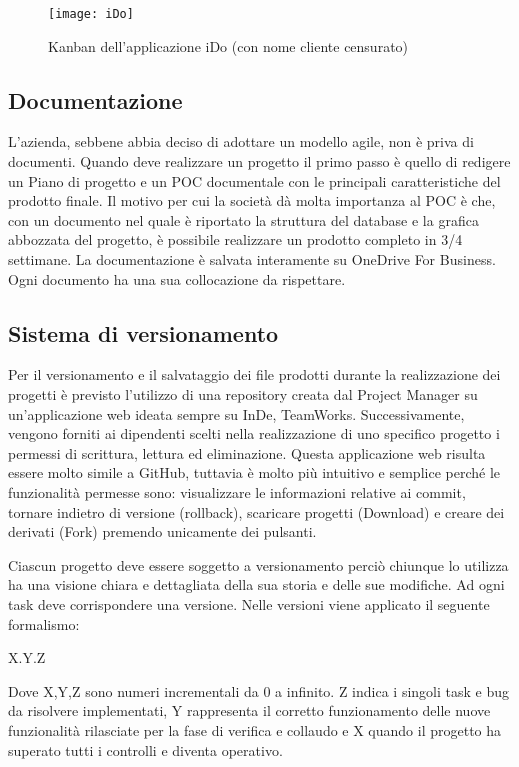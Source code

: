 \begin{figure}[!h] 
	\centering 
	\texttt{[image: iDo]} 
	\caption{Kanban dell'applicazione iDo (con nome cliente censurato)}
	\label{ido}
\end{figure}



\subsection{Documentazione}
\label{cap1:Documentazione}

L'azienda, sebbene abbia deciso di adottare un modello agile, non è priva di documenti. Quando deve realizzare un progetto il primo passo è quello di redigere un Piano di progetto e un POC documentale con le principali caratteristiche del prodotto finale. 
Il motivo per cui la società dà molta importanza al POC è che, con un documento nel quale è riportato la struttura del database e la grafica abbozzata del progetto, è possibile realizzare un prodotto completo in 3/4 settimane. 
La documentazione è salvata interamente su OneDrive For Business. Ogni documento ha una sua collocazione da rispettare. 

\subsection{Sistema di versionamento}
\label{cap1:Sistema di versionamento}

Per il versionamento e il salvataggio dei file prodotti durante la realizzazione dei progetti è previsto l'utilizzo di una repository creata dal Project Manager su un'applicazione web ideata sempre su InDe, TeamWorks. Successivamente, vengono forniti ai dipendenti scelti nella realizzazione di uno specifico progetto i permessi di scrittura, lettura ed eliminazione.
Questa applicazione web risulta essere molto simile a GitHub, tuttavia è molto più intuitivo e semplice perché le funzionalità permesse sono: visualizzare le informazioni relative ai commit, tornare indietro di versione (rollback), scaricare progetti (Download) e creare dei derivati (Fork) premendo unicamente dei pulsanti.

Ciascun progetto deve essere soggetto a versionamento perciò chiunque lo utilizza ha una visione chiara e dettagliata della sua storia e delle sue modifiche. Ad ogni task deve corrispondere una versione. Nelle versioni viene applicato il seguente formalismo:
\begin{center}
	X.Y.Z
\end{center}
Dove X,Y,Z sono numeri incrementali da 0 a infinito. 
Z indica i singoli task e bug da risolvere implementati, Y rappresenta il corretto funzionamento delle nuove funzionalità rilasciate per la fase di verifica e collaudo e X quando il progetto ha superato tutti i controlli e diventa operativo.  

